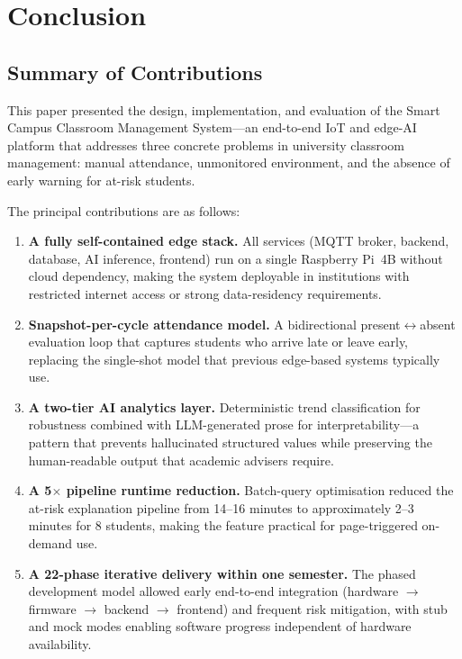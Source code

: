\section{Conclusion}
\label{sec:conclusion}

\subsection{Summary of Contributions}
\label{subsec:contributions}

This paper presented the design, implementation, and evaluation of the
Smart Campus Classroom Management System---an end-to-end IoT and edge-AI
platform that addresses three concrete problems in university classroom
management: manual attendance, unmonitored environment, and the absence
of early warning for at-risk students.

The principal contributions are as follows:

\begin{enumerate}
  \item \textbf{A fully self-contained edge stack.}  All services
    (MQTT broker, backend, database, AI inference, frontend) run on a
    single Raspberry Pi~4B without cloud dependency, making the system
    deployable in institutions with restricted internet access or strong
    data-residency requirements.

  \item \textbf{Snapshot-per-cycle attendance model.}  A bidirectional
    present$\leftrightarrow$absent evaluation loop that captures students
    who arrive late or leave early, replacing the single-shot model that
    previous edge-based systems typically use.

  \item \textbf{A two-tier AI analytics layer.}  Deterministic trend
    classification for robustness combined with LLM-generated prose for
    interpretability---a pattern that prevents hallucinated structured
    values while preserving the human-readable output that academic
    advisers require.

  \item \textbf{A 5$\times$ pipeline runtime reduction.}  Batch-query
    optimisation reduced the at-risk explanation pipeline from 14--16
    minutes to approximately 2--3 minutes for 8 students, making the
    feature practical for page-triggered on-demand use.

  \item \textbf{A 22-phase iterative delivery within one semester.}
    The phased development model allowed early end-to-end integration
    (hardware $\rightarrow$ firmware $\rightarrow$ backend $\rightarrow$
    frontend) and frequent risk mitigation, with stub and mock modes
    enabling software progress independent of hardware availability.
\end{enumerate}

